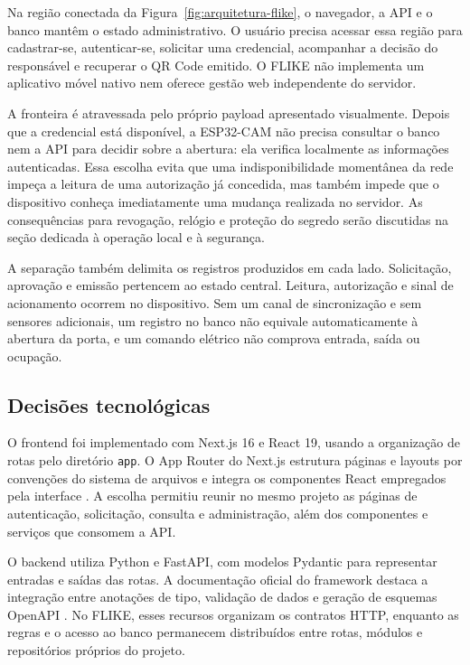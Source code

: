 Na região conectada da Figura~\ref{fig:arquitetura-flike}, o navegador, a API e o banco mantêm o estado administrativo. O usuário precisa acessar essa região para cadastrar-se, autenticar-se, solicitar uma credencial, acompanhar a decisão do responsável e recuperar o QR Code emitido. O FLIKE não implementa um aplicativo móvel nativo nem oferece gestão web independente do servidor.

A fronteira é atravessada pelo próprio payload apresentado visualmente. Depois que a credencial está disponível, a ESP32-CAM não precisa consultar o banco nem a API para decidir sobre a abertura: ela verifica localmente as informações autenticadas. Essa escolha evita que uma indisponibilidade momentânea da rede impeça a leitura de uma autorização já concedida, mas também impede que o dispositivo conheça imediatamente uma mudança realizada no servidor. As consequências para revogação, relógio e proteção do segredo serão discutidas na seção dedicada à operação local e à segurança.

A separação também delimita os registros produzidos em cada lado. Solicitação, aprovação e emissão pertencem ao estado central. Leitura, autorização e sinal de acionamento ocorrem no dispositivo. Sem um canal de sincronização e sem sensores adicionais, um registro no banco não equivale automaticamente à abertura da porta, e um comando elétrico não comprova entrada, saída ou ocupação.

\subsection{Decisões tecnológicas}

O frontend foi implementado com Next.js 16 e React 19, usando a organização de rotas pelo diretório \texttt{app}. O App Router do Next.js estrutura páginas e layouts por convenções do sistema de arquivos e integra os componentes React empregados pela interface \cite{vercel2026nextjs}. A escolha permitiu reunir no mesmo projeto as páginas de autenticação, solicitação, consulta e administração, além dos componentes e serviços que consomem a API.

O backend utiliza Python e FastAPI, com modelos Pydantic para representar entradas e saídas das rotas. A documentação oficial do framework destaca a integração entre anotações de tipo, validação de dados e geração de esquemas OpenAPI \cite{fastapi2026features}. No FLIKE, esses recursos organizam os contratos HTTP, enquanto as regras e o acesso ao banco permanecem distribuídos entre rotas, módulos e repositórios próprios do projeto.

